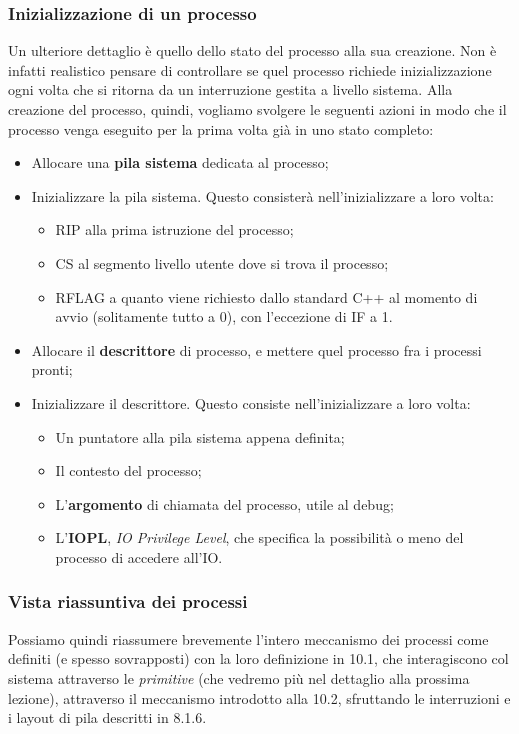 \documentclass[a4paper,11pt]{article}
\begin{document}
\subsubsection{Inizializzazione di un processo}
Un ulteriore dettaglio è quello dello stato del processo alla sua creazione.
Non è infatti realistico pensare di controllare se quel processo richiede inizializzazione ogni volta che si ritorna da un interruzione gestita a livello sistema.
Alla creazione del processo, quindi, vogliamo svolgere le seguenti azioni in modo che il processo venga eseguito per la prima volta già in uno stato completo:
\begin{itemize}
	\item Allocare una \textbf{pila sistema} dedicata al processo;
	\item Inizializzare la pila sistema. Questo consisterà nell'inizializzare a loro volta: 
		\begin{itemize}
			\item RIP alla prima istruzione del processo;
			\item CS al segmento livello utente dove si trova il processo;
			\item RFLAG a quanto viene richiesto dallo standard C++ al momento di avvio (solitamente tutto a 0), con l'eccezione di IF a 1.
		\end{itemize}
	\item Allocare il \textbf{descrittore} di processo, e mettere quel processo fra i processi pronti;
	\item Inizializzare il descrittore. Questo consiste nell'inizializzare a loro volta:
		\begin{itemize}
			\item Un puntatore alla pila sistema appena definita;
			\item Il contesto del processo;
			\item L'\textbf{argomento} di chiamata del processo, utile al debug;
			\item L'\textbf{IOPL}, \textit{IO Privilege Level}, che specifica la possibilità o meno del processo di accedere all'IO.
		\end{itemize}
\end{itemize}

\subsubsection{Vista riassuntiva dei processi}
Possiamo quindi riassumere brevemente l'intero meccanismo dei processi come definiti (e spesso sovrapposti) con la loro definizione in 10.1, che interagiscono col sistema attraverso le \textit{primitive} (che vedremo più nel dettaglio alla prossima lezione), attraverso il meccanismo introdotto alla 10.2, sfruttando le interruzioni e i layout di pila descritti in 8.1.6.
\end{document}
